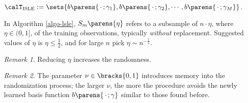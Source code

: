 \documentclass[12pt]{article}
\begin{document}
\begin{enumerate}[label=\textbf{\arabic*.}]
\begin{enumerate}
\begin{minipage}{\linewidth}
\begin{algorithm}[H]
\begin{algorithmic}[1]
				\RETURN $\calT_{\mathrm{ISLE}} := \sets{b \parens{\,\cdot\,; \gamma_1}, b \parens{\,\cdot\,; \gamma_2}, \cdots, b \parens{\,\cdot\,; \gamma_M}}$. 
			\end{algorithmic}
		\end{algorithm}
		\end{minipage}
		
		\vspace{10pt}
		
		In Algorithm \ref{algo-lsle}, $S_m \parens{\eta}$ refers to a subsample of $n \cdot \eta$, where $\eta \in (0, 1]$, of the training observations, typically \emph{without} replacement. Suggested values of $\eta$ is $\eta \le \frac{1}{2}$, and for large $n$ pick $\eta \sim n^{-\frac{1}{2}}$. 
		
		\textit{Remark 1.} Reducing $\eta$ increases the randomness. 
		
		\textit{Remark 2.} The parameter $\nu \in \bracks{0, 1}$ introduces memory into the randomization process; the larger $\nu$, the more the procedure avoids the newly learned basis function $b \parens{\,\cdot\,; \gamma}$ similar to those found before. 
		
	\end{enumerate}
	
\end{enumerate}


\printbibliography
\end{document}
